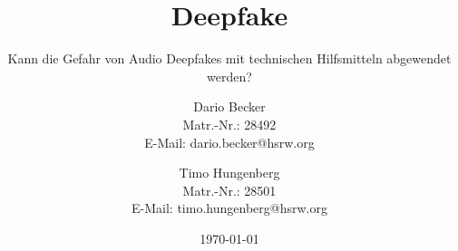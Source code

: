 \titlehead{
{\Large Hochschule Rhein Waal}\\
Fakultät für Kommunikation und Umwelt\\
Friedrich-Heinrich-Allee 25\\
47475 Kamp-Lintfort
}

\subject{
Abschlussbericht\\
\normalfont
im Modul Wissenschaftliches Arbeiten\\
}

\title{Deepfake}

\subtitle{Kann die Gefahr von Audio Deepfakes mit technischen Hilfsmitteln abgewendet werden?}

\author{
Dario Becker\\
\small
Matr.-Nr.: 28492\\
\small
E-Mail: dario.becker@hsrw.org
\and Timo Hungenberg\\
\small
Matr.-Nr.: 28501\\
\small
E-Mail: timo.hungenberg@hsrw.org
}

\date{\today}


\maketitle
